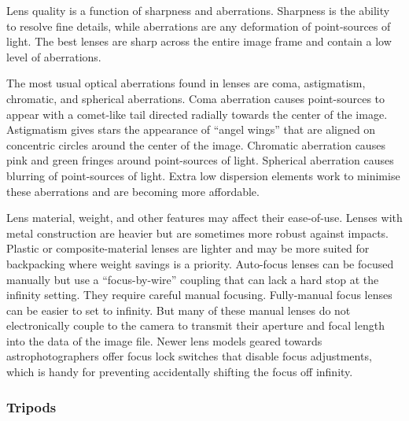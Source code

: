 \documentclass{article}
\begin{document}
Lens quality is a function of sharpness and aberrations. Sharpness is the ability to resolve fine details, while aberrations are any deformation of point-sources of light. The best lenses are sharp across the entire image frame and contain a low level of aberrations. 

The most usual optical aberrations found in lenses are coma, astigmatism, chromatic, and spherical aberrations. Coma aberration causes point-sources to appear with a comet-like tail directed radially towards the center of the image. Astigmatism gives stars the appearance of ``angel wings'' that are aligned on concentric circles around the center of the image. Chromatic aberration causes pink and green fringes around point-sources of light. Spherical aberration causes blurring of point-sources of light. Extra low dispersion elements work to minimise these aberrations and are becoming more affordable.

Lens material, weight, and other features may affect their ease-of-use. Lenses with metal construction are heavier but are sometimes more robust against impacts. Plastic or composite-material lenses are lighter and may be more suited for backpacking where weight savings is a priority. Auto-focus lenses can be focused manually but use a ``focus-by-wire'' coupling that can lack a hard stop at the infinity setting. They require careful manual focusing. Fully-manual focus lenses can be easier to set to infinity. But many of these manual lenses do not electronically couple to the camera to transmit their aperture and focal length into the data of the image file. Newer lens models geared towards astrophotographers offer focus lock switches that disable focus adjustments, which is handy for preventing accidentally shifting the focus off infinity. 

\subsubsection{Tripods}

\end{document}
